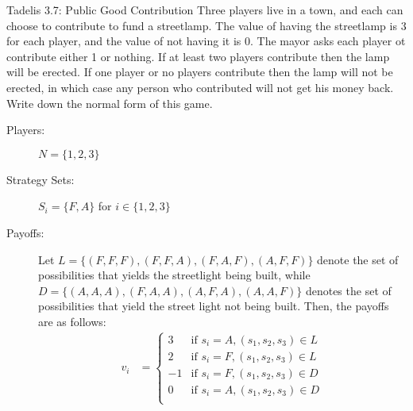 \documentclass[8pt]{extarticle}
\title{}
\author{Avinash Iyer}
\date{}
\begin{document}
  \begin{problem}{Tadelis 3.7: Public Good Contribution}
    Three players live in a town, and each can choose to contribute to fund a streetlamp. The value of having the streetlamp is $3$ for each player, and the value of not having it is 0. The mayor asks each player ot contribute either 1 or nothing. If at least two players contribute then the lamp will be erected. If one player or no players contribute then the lamp will not be erected, in which case any person who contributed will not get his money back. Write down the normal form of this game.
    \tcblower
    \begin{description}
      \item[Players:] $N = \{1,2,3\}$
      \item[Strategy Sets:] $S_i = \{F,A\}$ for $i\in \{1,2,3\}$
      \item[Payoffs:] Let $L = \{(F,F,F),(F,F,A),(F,A,F),(A,F,F)\}$ denote the set of possibilities that yields the streetlight being built, while $D = \{(A,A,A),(F,A,A),(A,F,A),(A,A,F)\}$ denotes the set of possibilities that yield the street light not being built. Then, the payoffs are as follows:
        \begin{align*}
          v_i &= \begin{cases}
            3 &\textrm{if } s_i = A,(s_1,s_2,s_3)\in L\\
            2 &\textrm{if } s_i = F,(s_1,s_2,s_3)\in L \\
            -1 &\textrm{if } s_i=F,(s_1,s_2,s_3)\in D\\
            0 &\textrm{if } s_i=A,(s_1,s_2,s_3)\in D\\
          \end{cases}
        \end{align*}
    \end{description}
  \end{problem}
\end{document}
